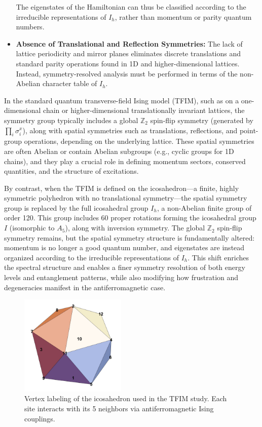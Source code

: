 \documentclass{article}
\begin{document}
\begin{itemize}
    The eigenstates of the Hamiltonian can thus be classified according to the irreducible representations of $I_h$, rather than momentum or parity quantum numbers.

    \item \textbf{Absence of Translational and Reflection Symmetries:} The lack of lattice periodicity and mirror planes eliminates discrete translations and standard parity operations found in 1D and higher-dimensional lattices. Instead, symmetry-resolved analysis must be performed in terms of the non-Abelian character table of $I_h$.
\end{itemize}


In the standard quantum transverse-field Ising model (TFIM), such as on a one-dimensional chain or higher-dimensional translationally invariant lattices, the symmetry group typically includes a global $\mathbb{Z}_2$ spin-flip symmetry (generated by $\prod_i \sigma_i^x$), along with spatial symmetries such as translations, reflections, and point-group operations, depending on the underlying lattice. These spatial symmetries are often Abelian or contain Abelian subgroups (e.g., cyclic groups for 1D chains), and they play a crucial role in defining momentum sectors, conserved quantities, and the structure of excitations.

By contrast, when the TFIM is defined on the icosahedron—a finite, highly symmetric polyhedron with no translational symmetry—the spatial symmetry group is replaced by the full icosahedral group $I_h$, a non-Abelian finite group of order 120. This group includes 60 proper rotations forming the icosahedral group $I$ (isomorphic to $A_5$), along with inversion symmetry. The global $\mathbb{Z}_2$ spin-flip symmetry remains, but the spatial symmetry structure is fundamentally altered: momentum is no longer a good quantum number, and eigenstates are instead organized according to the irreducible representations of $I_h$. This shift enriches the spectral structure and enables a finer symmetry resolution of both energy levels and entanglement patterns, while also modifying how frustration and degeneracies manifest in the antiferromagnetic case.

\begin{figure}[h]
    \centering
    \includegraphics[width=0.45\textwidth]{icosahedron.jpg}
    \caption{Vertex labeling of the icosahedron used in the TFIM study. Each site interacts with its 5 neighbors via antiferromagnetic Ising couplings.}
    \label{fig:icosahedron}
\end{figure}
\end{document}
